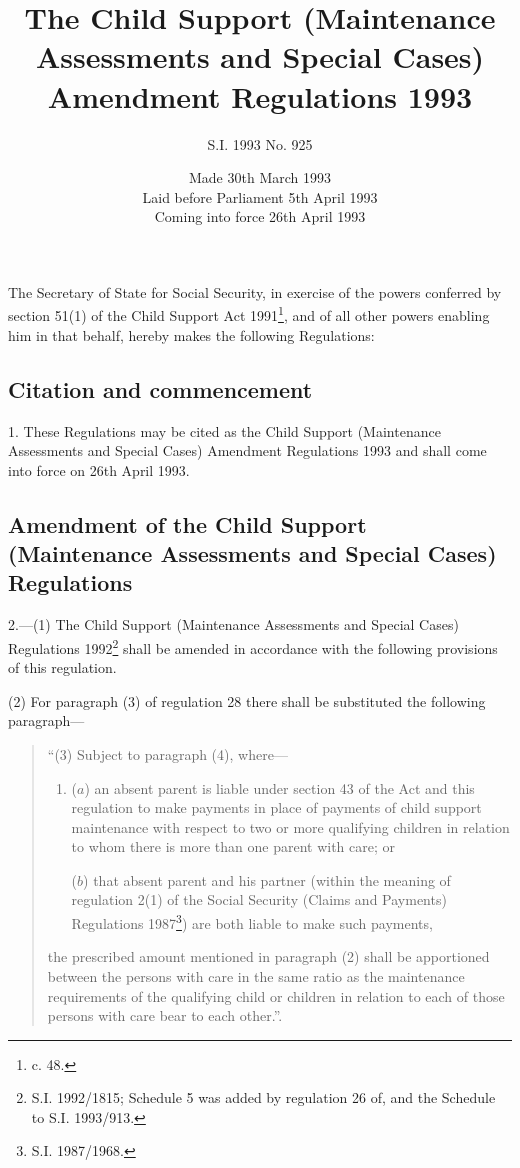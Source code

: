 \documentclass[a4paper]{article}
\title{The Child Support (Maintenance Assessments and Special Cases) Amendment Regulations 1993}
\author{S.I. 1993 No. 925}
\date{Made 30th March 1993\\Laid before Parliament 5th April 1993\\Coming into force 26th April 1993}
\begin{document}
\maketitle

\noindent
The Secretary of State for Social Security, in exercise of the powers conferred by section 51(1) of the Child Support Act 1991\footnote{ c. 48.}, and of all other powers enabling him in that behalf, hereby makes the following Regulations:

{\sloppy

\tableofcontents

}

\setcounter{secnumdepth}{-2}

\subsection[1. Citation and commencement]{Citation and commencement}

1.  These Regulations may be cited as the Child Support (Maintenance Assessments and Special Cases) Amendment Regulations 1993 and shall come into force on 26th April 1993.

\subsection[2. Amendment of the Child Support (Maintenance Assessments and Special Cases) Regulations]{Amendment of the Child Support (Maintenance Assessments and Special Cases) Regulations}

2.—(1) The Child Support (Maintenance Assessments and Special Cases) Regulations 1992\footnote{\frenchspacing S.I. 1992/1815; Schedule 5 was added by regulation 26 of, and the Schedule to S.I. 1993/913.} shall be amended in accordance with the following provisions of this regulation.

(2) For paragraph (3) of regulation 28 there shall be substituted the following paragraph—
\begin{quotation}
“(3) Subject to paragraph (4), where—
\begin{enumerate}\item[]
($a$) an absent parent is liable under section 43 of the Act and this regulation to make payments in place of payments of child support maintenance with respect to two or more qualifying children in relation to whom there is more than one parent with care; or

($b$) that absent parent and his partner (within the meaning of regulation 2(1) of the Social Security (Claims and Payments) Regulations 1987\footnote{\frenchspacing S.I. 1987/1968.}) are both liable to make such payments,
\end{enumerate}
the prescribed amount mentioned in paragraph (2) shall be apportioned between the persons with care in the same ratio as the maintenance requirements of the qualifying child or children in relation to each of those persons with care bear to each other.”.
\end{quotation}
\end{document}
